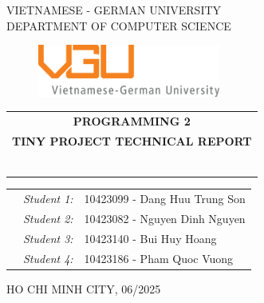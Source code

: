 \documentclass[11pt]{report}
\theoremstyle{mytheor}
\begin{document}
\begin{titlepage}
\begin{center}
VIETNAMESE - GERMAN UNIVERSITY \\
DEPARTMENT OF COMPUTER SCIENCE
\end{center}

\vspace{1cm}

\begin{figure}[h!]
\begin{center}
\includegraphics[width=6cm]{assets/vgu_logo_large.png}
\end{center}
\end{figure}

\vspace{2cm}

\begin{center}
\begin{tabular}{c}
\multicolumn{1}{c}{\textbf{{\Large PROGRAMMING 2}}} \\ 
\multicolumn{1}{c}{\textbf{{\Large TINY PROJECT TECHNICAL REPORT}}}

~~\\

\\
\multicolumn{1}{l}{\textbf{{\Large}}}\\
\\
\textbf{{\Large}}\\

\\
\\

\end{tabular}
\end{center}

\vspace{3cm}

\begin{table}[h]
\centering
\begin{tabular}{rrl}
&\textit{Student 1:} & 10423099 - Dang Huu Trung Son \\
&\textit{Student 2:} & 10423082 - Nguyen Dinh Nguyen \\
&\textit{Student 3:} & 10423140 - Bui Huy Hoang \\
&\textit{Student 4:} & 10423186 - Pham Quoc Vuong \\
\end{tabular}
\end{table}

\vspace{3cm}

\begin{center}
{\footnotesize HO CHI MINH CITY, 06/2025}
\end{center}

\end{titlepage}

\renewcommand{\contentsname}{Content}
\newpage
\vspace{1cm}
\tableofcontents

\newpage


\newpage


\newpage


\newpage

\end{document}
